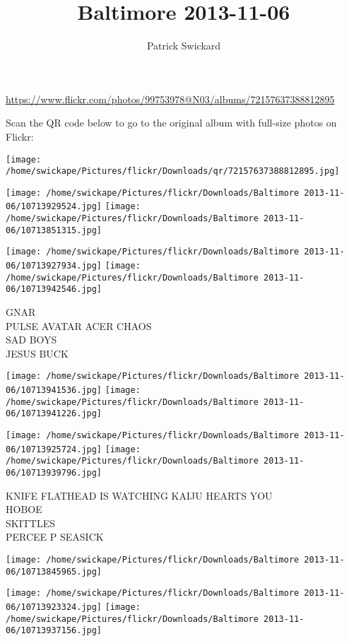 \documentclass[10pt,letterpaper]{article}
\title{Baltimore 2013-11-06}
\author{Patrick Swickard}
\date{}
\begin{document}
\maketitle

\url{https://www.flickr.com/photos/99753978@N03/albums/72157637388812895}

Scan the QR code below to go to the original album with full-size photos on Flickr:

\texttt{[image: /home/swickape/Pictures/flickr/Downloads/qr/72157637388812895.jpg]}
\pagebreak

\texttt{[image: /home/swickape/Pictures/flickr/Downloads/Baltimore 2013-11-06/10713929524.jpg]}
\texttt{[image: /home/swickape/Pictures/flickr/Downloads/Baltimore 2013-11-06/10713851315.jpg]}

\texttt{[image: /home/swickape/Pictures/flickr/Downloads/Baltimore 2013-11-06/10713927934.jpg]}
\texttt{[image: /home/swickape/Pictures/flickr/Downloads/Baltimore 2013-11-06/10713942546.jpg]}

GNAR\\
PULSE AVATAR ACER CHAOS\\
SAD BOYS\\
JESUS BUCK
\pagebreak

\texttt{[image: /home/swickape/Pictures/flickr/Downloads/Baltimore 2013-11-06/10713941536.jpg]}
\texttt{[image: /home/swickape/Pictures/flickr/Downloads/Baltimore 2013-11-06/10713941226.jpg]}

\texttt{[image: /home/swickape/Pictures/flickr/Downloads/Baltimore 2013-11-06/10713925724.jpg]}
\texttt{[image: /home/swickape/Pictures/flickr/Downloads/Baltimore 2013-11-06/10713939796.jpg]}

KNIFE FLATHEAD IS WATCHING KAIJU HEARTS YOU\\
HOBOE\\
SKITTLES\\
PERCEE P SEASICK
\pagebreak

\texttt{[image: /home/swickape/Pictures/flickr/Downloads/Baltimore 2013-11-06/10713845965.jpg]}

\vspace{0.25in}
\texttt{[image: /home/swickape/Pictures/flickr/Downloads/Baltimore 2013-11-06/10713923324.jpg]}
\texttt{[image: /home/swickape/Pictures/flickr/Downloads/Baltimore 2013-11-06/10713937156.jpg]}
\end{document}
